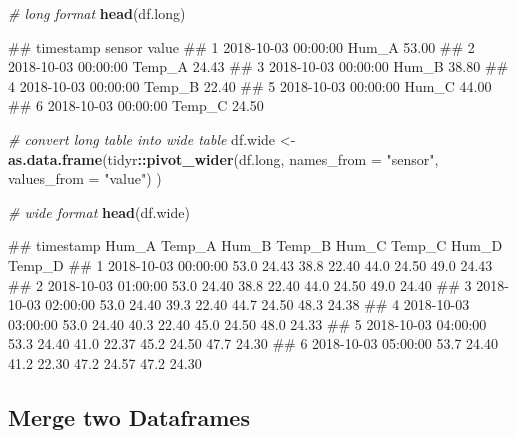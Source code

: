 \documentclass[
]{book}
\newenvironment{Shaded}{\begin{snugshade}}{\end{snugshade}}
\newcommand{\CommentTok}[1]{\textcolor[rgb]{0.56,0.35,0.01}{\textit{#1}}}
\newcommand{\DataTypeTok}[1]{\textcolor[rgb]{0.13,0.29,0.53}{#1}}
\newcommand{\KeywordTok}[1]{\textcolor[rgb]{0.13,0.29,0.53}{\textbf{#1}}}
\newcommand{\NormalTok}[1]{#1}
\newcommand{\OperatorTok}[1]{\textcolor[rgb]{0.81,0.36,0.00}{\textbf{#1}}}
\newcommand{\StringTok}[1]{\textcolor[rgb]{0.31,0.60,0.02}{#1}}
\let\oldShaded\Shaded
\let\endoldShaded\endShaded
\renewenvironment{Shaded}{\footnotesize\oldShaded}{\endoldShaded}
\let\oldverbatim\verbatim
\let\endoldverbatim\endverbatim
\renewenvironment{verbatim}{\footnotesize\oldverbatim}{\endoldverbatim}
\begin{document}
\begin{Shaded}
\begin{Highlighting}[]
\CommentTok{# long format}
\KeywordTok{head}\NormalTok{(df.long)}
\end{Highlighting}
\end{Shaded}

\begin{verbatim}
##             timestamp sensor value
## 1 2018-10-03 00:00:00  Hum_A 53.00
## 2 2018-10-03 00:00:00 Temp_A 24.43
## 3 2018-10-03 00:00:00  Hum_B 38.80
## 4 2018-10-03 00:00:00 Temp_B 22.40
## 5 2018-10-03 00:00:00  Hum_C 44.00
## 6 2018-10-03 00:00:00 Temp_C 24.50
\end{verbatim}

\begin{Shaded}
\begin{Highlighting}[]
\CommentTok{# convert long table into wide table}
\NormalTok{df.wide <-}\StringTok{ }\KeywordTok{as.data.frame}\NormalTok{(tidyr}\OperatorTok{::}\KeywordTok{pivot_wider}\NormalTok{(df.long,}
                                            \DataTypeTok{names_from =} \StringTok{"sensor"}\NormalTok{,}
                                            \DataTypeTok{values_from =} \StringTok{"value"}\NormalTok{)}
\NormalTok{                         )}

\CommentTok{# wide format}
\KeywordTok{head}\NormalTok{(df.wide)}
\end{Highlighting}
\end{Shaded}

\begin{verbatim}
##             timestamp Hum_A Temp_A Hum_B Temp_B Hum_C Temp_C Hum_D Temp_D
## 1 2018-10-03 00:00:00  53.0  24.43  38.8  22.40  44.0  24.50  49.0  24.43
## 2 2018-10-03 01:00:00  53.0  24.40  38.8  22.40  44.0  24.50  49.0  24.40
## 3 2018-10-03 02:00:00  53.0  24.40  39.3  22.40  44.7  24.50  48.3  24.38
## 4 2018-10-03 03:00:00  53.0  24.40  40.3  22.40  45.0  24.50  48.0  24.33
## 5 2018-10-03 04:00:00  53.3  24.40  41.0  22.37  45.2  24.50  47.7  24.30
## 6 2018-10-03 05:00:00  53.7  24.40  41.2  22.30  47.2  24.57  47.2  24.30
\end{verbatim}

\hypertarget{DATAWRANGLING-MERGE-TWO-DATAFRAMES}{%
\subsection{Merge two Dataframes}\label{DATAWRANGLING-MERGE-TWO-DATAFRAMES}}
\end{document}
